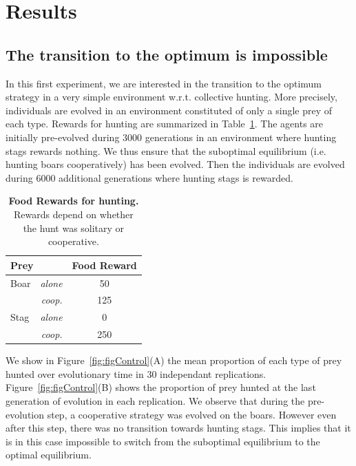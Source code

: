 \section{Results}
  \subsection{The transition to the optimum is impossible}
    In this first experiment, we are interested in the transition to the optimum strategy in a very simple environment w.r.t. collective hunting. More precisely, individuals are evolved in an environment constituted of only a single prey of each type. Rewards for hunting are summarized in Table~\ref{table:tableRewards}. The agents are initially pre-evolved during $3000$ generations in an environment where hunting stags rewards nothing. We thus ensure that the suboptimal equilibrium (i.e. hunting boars cooperatively) has been evolved. Then the individuals are evolved during $6000$ additional generations where hunting stags is rewarded.

    \begin{table}[ht]
      \centering
        \begin{tabular}{|l|r|c|}
          \hline
          \multicolumn{2}{|l|}{\textbf{Prey}} & \textbf{Food Reward} \\
          \hline
          Boar & \textit{alone} & 50 \\
          \hline
          & \textit{coop.} & 125 \\
          \hline
          Stag & \textit{alone} & 0 \\
          \hline
          & \textit{coop.} & 250 \\
          \hline
        \end{tabular}
        \caption{\textbf{Food Rewards for hunting.}
        Rewards depend on whether the hunt was solitary or cooperative.}
      \label{table:tableRewards}
    \end{table}

    We show in Figure~\ref{fig:figControl}(A) the mean proportion of each type of prey hunted over evolutionary time in $30$ independant replications. Figure~\ref{fig:figControl}(B) shows the proportion of prey hunted at the last generation of evolution in each replication. We observe that during the pre-evolution step, a cooperative strategy was evolved on the boars. However even after this step, there was no transition towards hunting stags. This implies that it is in this case impossible to switch from the suboptimal equilibrium to the optimal equilibrium. 

